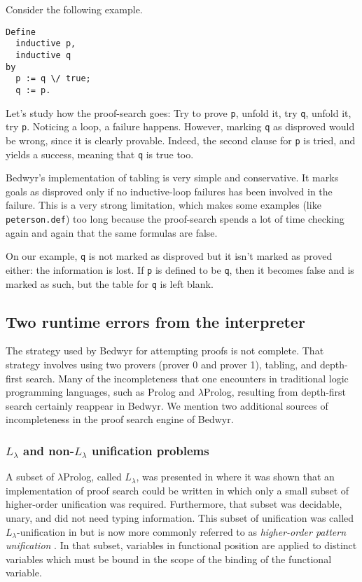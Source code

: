 \documentclass{article}
\newcommand{\lp}{$\lambda$Prolog}
\newcommand{\Ll}{$L_\lambda$}
\begin{document}
Consider the following example.
\begin{verbatim}
Define
  inductive p,
  inductive q
by
  p := q \/ true;
  q := p.
\end{verbatim}

Let's study how the proof-search goes:
Try to prove \verb.p., unfold it, try \verb.q., unfold it, try \verb.p..
Noticing a loop, a failure happens.
However, marking \verb.q. as disproved would be wrong,
since it is clearly provable.
Indeed, the second clause for \verb.p. is tried, and yields a
success, meaning that \verb.q. is true too.

Bedwyr's implementation of tabling is very simple and conservative.
It marks goals as
disproved only if no inductive-loop failures has been involved in the failure.
This is a very strong limitation, which makes some examples (like
\verb+peterson.def+) too long because the proof-search spends a lot of time
checking again and again that the same formulas are false.

On our example, \verb.q. is not marked as disproved
but it isn't marked as proved either: the information is lost.
If \verb.p. is defined to be \verb.q.,
then it becomes false and is marked as such,
but the table for \verb.q. is left blank.

\subsection{Two runtime errors from the interpreter}

The strategy used by Bedwyr for attempting proofs is not complete.
That strategy involves using two provers (prover 0 and prover 1),
tabling, and depth-first search.
Many of the incompleteness that one encounters in
traditional logic programming languages, such as Prolog and \lp{},
resulting from depth-first search certainly reappear in Bedwyr.  We
mention two additional sources of incompleteness in the proof search
engine of Bedwyr.

\subsubsection{\Ll{} and non-\Ll{} unification problems}
A subset of \lp, called \Ll, was presented in \cite{miller91jlc} where
it was shown that an implementation of proof search could be written
in which only a small subset of higher-order unification was required.
Furthermore, that subset was decidable, unary, and did not need typing
information.  This subset of unification was called \Ll-unification in
\cite{miller91jlc} but is now more commonly referred to as {\em
  higher-order pattern unification}
\cite{nipkow93lics,nadathur05iclp}.  In that subset, variables in
functional position are applied to distinct variables which must be
bound in the scope of the binding of the functional variable.
\end{document}
